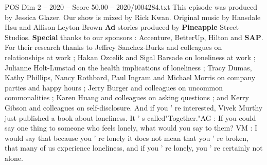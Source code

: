 \begin{textsample}{POS Dim 2 – 2020 – Score 50.00 – 2020/t004284.txt}
This episode was produced by Jessica Glazer.
Our show is mixed by Rick Kwan.
Original music by Hansdale Hsu and Allison Leyton-Brown \textbf{Ad} stories produced by \textbf{Pineapple} Street Studios. \textbf{Special} thanks to our sponsors : Accenture, BetterUp, Hilton and \textbf{SAP}.
For their research thanks to Jeffrey Sanchez-Burks and colleagues on relationships at work ; Hakan Ozcelik and Sigal Barsade on loneliness at work ; Julianne Holt-Lunstad on the health implications of loneliness ; Tracy Dumas, Kathy Phillips, Nancy Rothbard, Paul Ingram and Michael Morris on company parties and happy hours ; Jerry Burger and colleagues on uncommon commonalities ; Karen Huang and colleagues on asking questions ; and Kerry Gibson and colleagues on self-disclosure.
And if you ' re interested, Vivek Murthy just published a book about loneliness.
It ' s called"Together."AG : If you could say one thing to someone who feels lonely, what would you say to them?
VM : I would say that because you ' re lonely it does not mean that you ' re broken, that many of us experience loneliness, and if you ' re lonely, you ' re certainly not alone.

\end{textsample}
